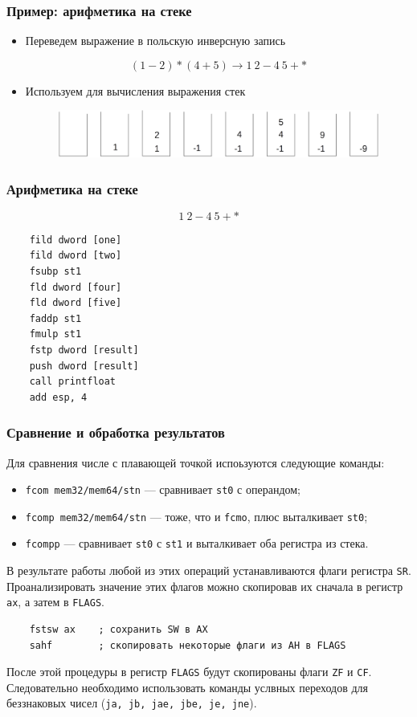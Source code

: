 \documentclass[utf8, russian, aspectratio=1610]{beamer}
\begin{document}
\begin{frame}
    \frametitle{Пример: арифметика на стеке}

    \begin{itemize}
        \item Переведем выражение в польскую инверсную запись

            $$
            (1 - 2)*(4 + 5) \rightarrow 1~2 - 4~5 + *
            $$

        \item Используем для вычисления выражения стек
        \begin{figure}
            \centering
            \includegraphics[width=1.0\textwidth]{fig/stack_arithm_crop.png}
        \end{figure}
    \end{itemize}
\end{frame}

\begin{frame}[fragile]
    \frametitle{Арифметика на стеке}
    $$1~2 - 4~5 + *$$
\begin{verbatim}
    fild dword [one]
    fild dword [two]
    fsubp st1
    fld dword [four]
    fld dword [five]
    faddp st1
    fmulp st1
    fstp dword [result]
    push dword [result]
    call printfloat
    add esp, 4
\end{verbatim}
\end{frame}

\begin{frame}[fragile]
    \frametitle{Сравнение и обработка результатов}
    Для сравнения числе с плавающей точкой испоьзуются следующие команды:
    \begin{itemize}
        \item {\tt fcom mem32/mem64/stn} --- сравнивает {\tt st0} с операндом;
        \item {\tt fcomp mem32/mem64/stn} --- тоже, что и {\tt fcmo}, плюс выталкивает {\tt st0};
        \item {\tt fcompp} --- сравнивает {\tt st0} с {\tt st1} и выталкивает оба регистра из стека. 
    \end{itemize}
    В результате работы любой из этих операций устанавливаются флаги регистра {\tt SR}. Проанализировать значение этих флагов можно скопировав их сначала в регистр {\tt ax}, а затем в {\tt FLAGS}.
\begin{verbatim}
    fstsw ax    ; сохранить SW в AX
    sahf        ; скопировать некоторые флаги из AH в FLAGS
\end{verbatim}

    После этой процедуры в регистр {\tt FLAGS} будут скопированы флаги {\tt ZF} и {\tt CF}. Следовательно необходимо использовать команды услвных переходов для беззнаковых чисел ({\tt ja, jb, jae, jbe, je, jne}).
\end{frame}
\end{document}
